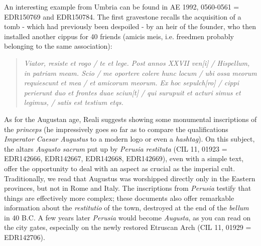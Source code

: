 \documentclass[amsthm,ebook]{saparticle}
\begin{document}
An interesting example from Umbria can be found in AE 1992, 0560-0561 = EDR150769 and EDR150784. The first gravestone
recalls the acquisition of a tomb - which had previously been despoiled - by an heir of the founder, who then installed
another cippus for 40 friends (amicis meis, i.e. freedmen probably belonging to the same association):
\begin{quotation}

\emph{Viator, resiste et rogo / te et lege. Post annos XXVII ven[i] / Hispellum, in patriam meam. Scio / me oportere colere
hunc locum / ubi ossa meorum requiescunt et mea / et amicorum meorum. Ex hoc sepulch[ro] / cippi perierunt duo et
frontes duae sciun[t] / qui surupuit et acturi simus et legimus, / satis est testium etqs.}

\end{quotation}
As for the Augustan age, Reali suggests showing some monumental inscriptions of the \emph{princeps} (he impressively goes so
far as to compare the qualifications \emph{Imperator Caesar Augustus} to a modern logo or even a \emph{hashtag}). On
this subject, the altars \emph{Augusto sacrum} put up by \emph{Perusia restituta} (CIL 11, 01923 = EDR142666, EDR142667, EDR142668,
EDR142669), even with a simple text, offer the opportunity to deal with an aspect as crucial as the imperial cult.
Traditionally, we read that Augustus was worshipped directly only in the Eastern provinces, but not in Rome and Italy.
The inscriptions from \emph{Perusia} testify that things are effectively more complex; these documents also offer remarkable
information about the \emph{restitutio} of the town, destroyed at the end of the \emph{bellum} in 40 B.C. A few years later \emph{Perusia}
would become \emph{Augusta}, as you can read on the city gates, especially on the newly restored Etruscan Arch (CIL 11, 01929
= EDR142706).
\end{document}
